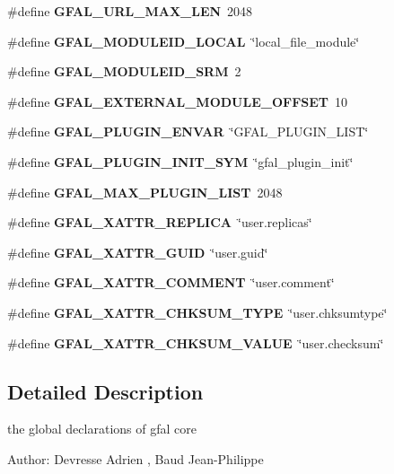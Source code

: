 \begin{CompactItemize}
\item 
\#define \textbf{GFAL\_\-URL\_\-MAX\_\-LEN}~2048\label{gfal__constants_8h_8aeca034bb7345f07b3b736501168cdd}

\item 
\#define \textbf{GFAL\_\-MODULEID\_\-LOCAL}~\char`\"{}local\_\-file\_\-module\char`\"{}\label{gfal__constants_8h_6843a99bf27c1e7f0ea245ba0a4b4638}

\item 
\#define \textbf{GFAL\_\-MODULEID\_\-SRM}~2\label{gfal__constants_8h_81086ad079cc0d38b02e33018b11cb78}

\item 
\#define \textbf{GFAL\_\-EXTERNAL\_\-MODULE\_\-OFFSET}~10\label{gfal__constants_8h_c3acf68b834fb0400f412735badbe8bb}

\item 
\#define \textbf{GFAL\_\-PLUGIN\_\-ENVAR}~\char`\"{}GFAL\_\-PLUGIN\_\-LIST\char`\"{}\label{gfal__constants_8h_c414ec8b2ed505d8318b1102ea3dd987}

\item 
\#define \textbf{GFAL\_\-PLUGIN\_\-INIT\_\-SYM}~\char`\"{}gfal\_\-plugin\_\-init\char`\"{}\label{gfal__constants_8h_6549284d505729b12a761cbb6c3914f5}

\item 
\#define \textbf{GFAL\_\-MAX\_\-PLUGIN\_\-LIST}~2048\label{gfal__constants_8h_8b50ed92a1ea58484de650f667db28f1}

\item 
\#define \textbf{GFAL\_\-XATTR\_\-REPLICA}~\char`\"{}user.replicas\char`\"{}\label{gfal__constants_8h_99cf748c03f297ef6e429cbd2dfe3c35}

\item 
\#define \textbf{GFAL\_\-XATTR\_\-GUID}~\char`\"{}user.guid\char`\"{}\label{gfal__constants_8h_a395dff27be0cd2e43081098f5c68833}

\item 
\#define \textbf{GFAL\_\-XATTR\_\-COMMENT}~\char`\"{}user.comment\char`\"{}\label{gfal__constants_8h_43f447aa0c1b5fe95a4c79b23c770952}

\item 
\#define \textbf{GFAL\_\-XATTR\_\-CHKSUM\_\-TYPE}~\char`\"{}user.chksumtype\char`\"{}\label{gfal__constants_8h_fc6ffd43ad73ab219155b61c02405aec}

\item 
\#define \textbf{GFAL\_\-XATTR\_\-CHKSUM\_\-VALUE}~\char`\"{}user.checksum\char`\"{}\label{gfal__constants_8h_2e084155870841ad60f7353089f3bdf4}

\end{CompactItemize}


\subsection{Detailed Description}
the global declarations of gfal core \begin{Desc}
\item[Author:]Devresse Adrien , Baud Jean-Philippe \end{Desc}
